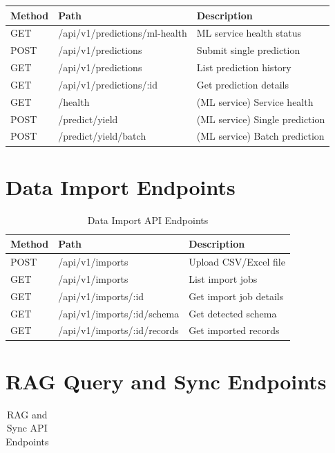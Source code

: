 \documentclass[12pt,a4paper,oneside]{report}
\begin{document}
\begin{appendix}
\begin{longtable}{lll}
\textbf{Method} & \textbf{Path} & \textbf{Description} \\

\endhead

\endfoot

\endlastfoot
GET & /api/v1/predictions/ml-health & ML service health status \\
POST & /api/v1/predictions & Submit single prediction \\
GET & /api/v1/predictions & List prediction history \\
GET & /api/v1/predictions/:id & Get prediction details \\
GET & /health & (ML service) Service health \\
POST & /predict/yield & (ML service) Single prediction \\
POST & /predict/yield/batch & (ML service) Batch prediction \\
\end{longtable}

\section{Data Import Endpoints}
\begin{longtable}{lll}
\caption{Data Import API Endpoints} \\

\textbf{Method} & \textbf{Path} & \textbf{Description} \\

\endhead

\endfoot

\endlastfoot
POST & /api/v1/imports & Upload CSV/Excel file \\
GET & /api/v1/imports & List import jobs \\
GET & /api/v1/imports/:id & Get import job details \\
GET & /api/v1/imports/:id/schema & Get detected schema \\
GET & /api/v1/imports/:id/records & Get imported records \\
\end{longtable}

\section{RAG Query and Sync Endpoints}
\begin{longtable}{lll}
\caption{RAG and Sync API Endpoints} \\


\end{longtable}
\end{appendix}
\end{document}
